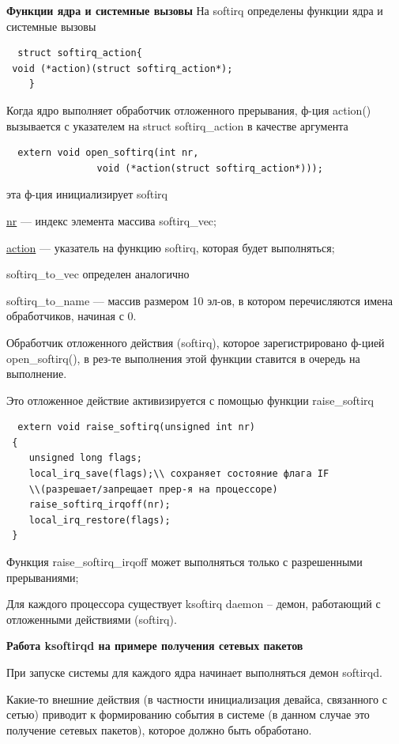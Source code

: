 \textbf{Функции ядра и системные вызовы}
На softirq определены функции ядра и системные вызовы
\begin{lstlisting}
  struct softirq_action{
 void (*action)(struct softirq_action*);
    }
\end{lstlisting}

Когда ядро выполняет обработчик отложенного прерывания, ф-ция action() вызывается с указателем на struct
softirq\_action в качестве аргумента

\begin{lstlisting}
  extern void open_softirq(int nr, 
                void (*action(struct softirq_action*)));
\end{lstlisting}
эта ф-ция инициализирует softirq

\underline{nr} --- индекс элемента массива softirq\_vec;

\underline{action} --- указатель на функцию softirq, которая будет выполняться;

softirq\_to\_vec определен аналогично

softirq\_to\_name --- массив размером 10 эл-ов, в котором перечисляются имена обработчиков, начиная с 0.

Обработчик отложенного действия (softirq), которое зарегистрировано ф-цией open\_softirq(), в рез-те выполнения этой функции ставится в очередь на выполнение.

Это отложенное действие активизируется с помощью функции raise\_softirq
\begin{lstlisting}
  extern void raise_softirq(unsigned int nr)
 {
    unsigned long flags;
    local_irq_save(flags);\\ сохраняет состояние флага IF
    \\(разрешает/запрещает прер-я на процессоре)
    raise_softirq_irqoff(nr);
    local_irq_restore(flags);
 }
\end{lstlisting}

Функция raise\_softirq\_irqoff может выполняться только с разрешенными прерываниями;

Для каждого процессора существует ksoftirq daemon -- демон, работающий с отложенными действиями (softirq).

\textbf{Работа ksoftirqd на примере получения сетевых пакетов}

При запуске системы для каждого ядра начинает выполняться демон softirqd.

Какие-то внешние действия (в частности инициализация девайса, связанного с сетью) приводит к формированию события в системе (в данном случае это получение сетевых пакетов), которое должно быть обработано.

